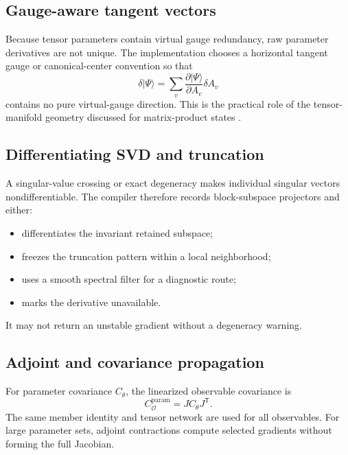 \documentclass[11pt]{article}
\newcommand{\cO}{\mathcal O}
\begin{document}
\subsection{Gauge-aware tangent vectors}

Because tensor parameters contain virtual gauge redundancy, raw parameter
derivatives are not unique.  The implementation chooses a horizontal tangent
gauge or canonical-center convention so that
\begin{equation}
 \delta|\Psi\rangle
 =
 \sum_v
 \frac{\partial|\Psi\rangle}{\partial A_v}\delta A_v
\label{eq:tn-tangent}
\end{equation}
contains no pure virtual-gauge direction.  This is the practical role of the
tensor-manifold geometry discussed for matrix-product states
\cite{Haegeman2014,Haegeman2013}.

\subsection{Differentiating SVD and truncation}

A singular-value crossing or exact degeneracy makes individual singular
vectors nondifferentiable.  The compiler therefore records block-subspace
projectors and either:
\begin{itemize}
 \item differentiates the invariant retained subspace;
 \item freezes the truncation pattern within a local neighborhood;
 \item uses a smooth spectral filter for a diagnostic route;
 \item marks the derivative unavailable.
\end{itemize}
It may not return an unstable gradient without a degeneracy warning.

\subsection{Adjoint and covariance propagation}

For parameter covariance \(C_{\theta}\), the linearized observable covariance
is
\begin{equation}
 C_{\cO}^{\mathrm{param}}
 =JC_{\theta}J^{\mathsf T}.
\label{eq:jacobian-covariance}
\end{equation}
The same member identity and tensor network are used for all observables.  For
large parameter sets, adjoint contractions compute selected gradients without
forming the full Jacobian.
\end{document}
